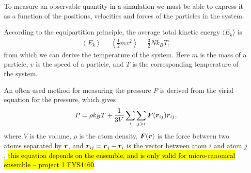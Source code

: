To measure an observable quantity in a simulation we must be able to express it as a function of the positions, velocities and forces of the particles in the system. 

According to the equipartition principle, the average total kinetic energy $\langle E_k \rangle$ is
\begin{align*}
    \left\langle E_k \right\rangle = \left\langle \frac{1}{2}mv^2 \right\rangle = \frac{3}{2}Nk_B T,
\end{align*}
from which we can derive the temperature of the system. Here $m$ is the mass of a particle, $v$ is the speed of a particle, and $T$ is the corresponding temperature of the system.

An often used method for measuring the pressure $P$ is derived from the virial equation for the pressure, which gives
\begin{align*}
    P = \rho k_B T + \frac{1}{3V}\sum_i \sum_{j>i} \boldsymbol{F}(\boldsymbol{r}_{ij}) \boldsymbol{r}_{ij},
\end{align*}
where $V$ is the volume, $\rho$ is the atom density, $\boldsymbol{F}(\boldsymbol{r})$ is the force between two atoms separated by $\boldsymbol{r}$, and $\boldsymbol{r}_{ij} = \boldsymbol{r}_j - \boldsymbol{r}_i$ is the vector between atom $i$ and atom $j$. \hl{this equation depends on the ensemble, and is only valid for micro-canonical ensemble -- project 1 FYS4460}.




